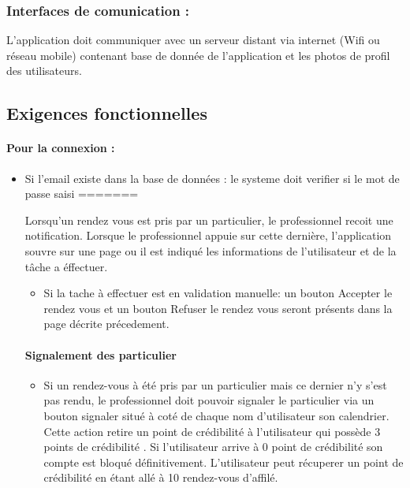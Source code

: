 \documentclass{article}
\begin{document}
\begin{itemize}
\subsubsection{Interfaces de comunication :}
L'application doit communiquer avec un serveur distant via internet
(Wifi ou réseau mobile) contenant base de donnée de l'application et
les photos de profil des utilisateurs.


\subsection{Exigences fonctionnelles}
\paragraph{Pour la connexion : }

\begin{itemize}
\item Si l'email existe dans la base de données :
	le systeme doit verifier si le mot de passe saisi
=======


Lorsqu'un rendez vous est pris par un particulier, le
  professionnel recoit une notification. Lorsque le professionnel
  appuie sur cette dernière, l'application souvre sur une page ou il
  est indiqué les informations de l'utilisateur et de la tâche a éffectuer.
\begin{itemize}
\item  Si la tache à effectuer est en validation manuelle: un bouton \og
  Accepter le rendez vous \fg{} et un bouton \og
  Refuser le rendez vous \fg{} seront présents dans la page décrite précedement.
\end{itemize}
\paragraph{Signalement des particulier}
\begin{itemize}
\item Si un rendez-vous à été pris par un particulier mais ce dernier
  n'y s'est pas rendu, le professionnel doit pouvoir
  signaler le particulier via un bouton \og signaler \fg{} situé
  à coté de chaque nom d'utilisateur son calendrier. Cette action retire un \og point de crédibilité \fg{} à l'utilisateur qui possède
  3 \og points de crédibilité \fg{}. Si l'utilisateur arrive à 0 point de crédibilité son compte est
  bloqué définitivement. L'utilisateur peut récuperer un point de crédibilité  en étant
  allé à 10 rendez-vous d'affilé.
\end{itemize}


\end{itemize}
\end{itemize}
\end{document}
